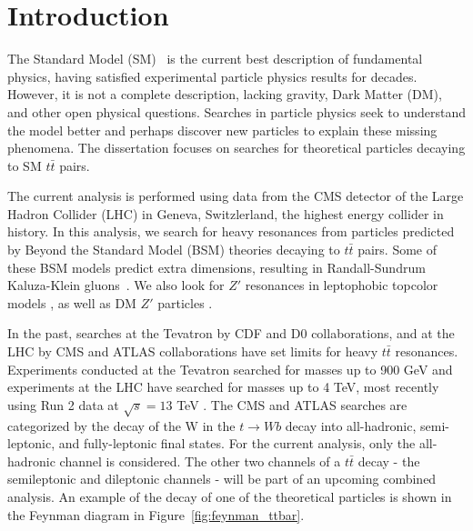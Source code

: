 \chapter{Introduction}\label{chap:intro}



The Standard Model (SM)~\cite{pdg} is the current best description of fundamental physics, having satisfied experimental particle physics results for decades. However, it is not a complete description, lacking gravity, Dark Matter (DM), and other open physical questions. Searches in particle physics seek to understand the model better and perhaps discover new particles to explain these missing phenomena. The dissertation focuses on searches for theoretical particles decaying to SM $t\bar{t}$ pairs.


The current analysis is performed using data from the CMS detector of the Large Hadron Collider (LHC) in Geneva, Switzlerland, the highest energy collider in history. In this analysis, we search for heavy resonances from particles predicted by Beyond the Standard Model (BSM) theories decaying to $t\bar{t}$ pairs. Some of these BSM models predict extra dimensions, resulting in Randall-Sundrum Kaluza-Klein gluons~\cite{rs1, ExtraDim}. We also look for $Z'$ resonances in leptophobic topcolor models \cite{leptophobicZprime, Zprimettxs, ZprimeCoupledtoGen3, WarpedGaugeBosons}, as well as DM $Z'$ particles \cite{wasmer_dark_matter}.


In the past, searches at the Tevatron by CDF and D0 collaborations, and at the LHC by CMS and ATLAS collaborations have set limits for heavy $t\bar{t}$ resonances. Experiments conducted at the Tevatron searched for masses up to 900 GeV \cite{cdftt3, d0tt} and experiments at the LHC have searched for masses up to 4 TeV, most recently using Run 2 data at $\sqrt{s} = 13$ TeV \cite{7tevZprime_CMSAllHad, 7tevZprime_CMSSemilept, 7tevZprime_ATLASAllHad, 7tevZprime_ATLASSemilept, 8tevZprime_CMSAllHad, 8tevZprime_CMSAllHadSemilept, 8tevZprime_CMSAllHadSemileptLept, 8tevZprime_ATLASSemilept, AN-2016-459}. The CMS and ATLAS searches are categorized by the decay of the W in the $t \rightarrow W b$ decay into all-hadronic, semi-leptonic, and fully-leptonic final states. For the current analysis, only the all-hadronic channel is considered. The other two channels of a $t\bar{t}$ decay - the semileptonic and dileptonic channels - will be part of an upcoming combined analysis. An example of the decay of one of the theoretical particles is shown in the Feynman diagram in Figure~\ref{fig:feynman_ttbar}.

